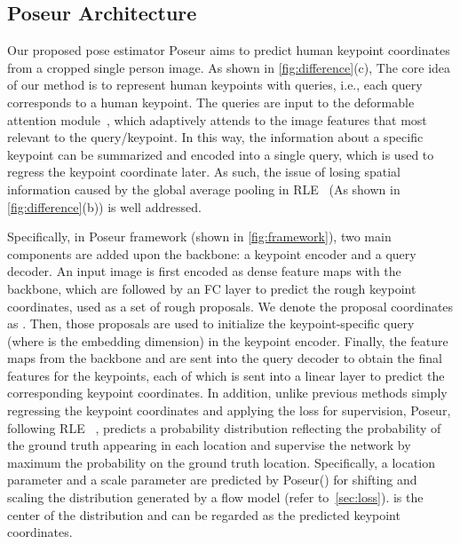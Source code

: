 \documentclass[runningheads]{llncs}
\def\ie{{i.e.\xspace}}
\def\handle{{Poseur}\xspace}
\begin{document}
\subsection{\handle Architecture}\label{sec:Architecture}






Our proposed pose estimator \handle aims to predict  human keypoint coordinates from a cropped single person image.
As shown in \cref{fig:difference}(c), The core idea of our method is to represent human keypoints with queries, \ie, each query corresponds to a human keypoint. The queries are input to the deformable attention module~\cite{zhu2020deformable}, which adaptively attends to the image features that most relevant to the query/keypoint. In this way, the information about a specific keypoint can be summarized and encoded into a single query, which is used to regress the keypoint coordinate later. As such, the issue of losing spatial information caused by the global average pooling in RLE~\cite{li2021human} (As shown in \cref{fig:difference}(b)) is well addressed.





Specifically, in \handle framework (shown in \cref{fig:framework}), two main components are added upon the backbone: a keypoint encoder and a query decoder. An input image is first encoded as dense feature maps with the backbone, which are followed by an FC layer to predict the rough keypoint coordinates, used as a set of rough proposals.
We denote the proposal coordinates as . Then, those proposals are used to initialize the keypoint-specific query  (where  is the embedding dimension) in the keypoint encoder. Finally, the feature maps from the backbone and  are sent into the query decoder to obtain the final features for the keypoints, each of which is sent into a linear layer to predict the corresponding keypoint coordinates.
In addition, unlike previous methods simply regressing the keypoint coordinates and applying the  loss for supervision, 
\handle, following RLE ~\cite{li2021human}, predicts a probability distribution reflecting the probability of the ground truth appearing in each location and supervise the network by maximum the probability on the ground truth location. Specifically, a location parameter  and a scale parameter  are predicted by \handle () for shifting and scaling the distribution generated by a flow model  (refer to~\cref{sec:loss}).  is the center of the distribution and can be regarded as the predicted keypoint coordinates.
\end{document}
